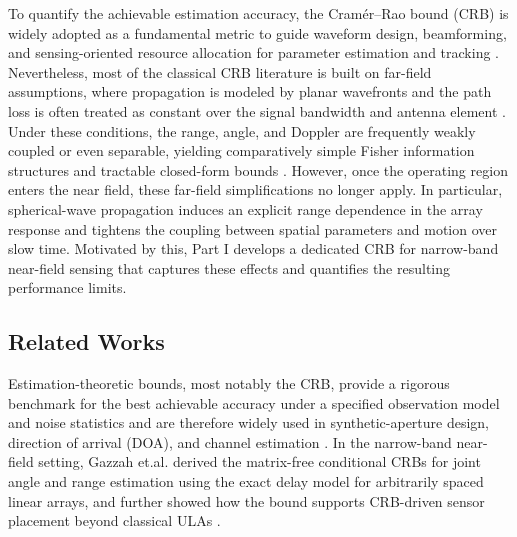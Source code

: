 \documentclass[9pt,final,journal,twocolumn]{IEEEtran}
\begin{document}
To quantify the achievable estimation accuracy, the Cramér–Rao bound (CRB) is widely adopted as a fundamental metric to guide waveform design, beamforming, and sensing-oriented resource allocation for parameter estimation and tracking \cite{esmaeilbeig2022cramer,dokhanchi2019mmWave,lv2022co,wang2024crb2}. Nevertheless, most of the classical CRB literature is built on far-field assumptions, where propagation is modeled by planar wavefronts and the path loss is often treated as constant over the signal bandwidth and antenna element \cite{stoica2005spectral,dogandzic2001crb}. Under these conditions, the range, angle, and Doppler are frequently weakly coupled or even separable, yielding comparatively simple Fisher information structures and tractable closed-form bounds \cite{dogandzic2001crb}. However, once the operating region enters the near field, these far-field simplifications no longer apply. In particular, spherical-wave propagation induces an explicit range dependence in the array response and tightens the coupling between spatial parameters and motion over slow time. Motivated by this, Part I develops a dedicated CRB for narrow-band near-field sensing that captures these effects and quantifies the resulting performance limits.

\vspace{-0.3cm}
\subsection{Related Works}
\vspace{-0.1cm}
Estimation-theoretic bounds, most notably the CRB, provide a rigorous benchmark for the best achievable accuracy under a specified observation model and noise statistics and are therefore widely used in synthetic-aperture design, direction of arrival (DOA), and channel estimation \cite{stoica1990performance,dong2002optimal,wei2025crb}. In the narrow-band near-field setting, Gazzah et.al. derived the matrix-free conditional CRBs for joint angle and range estimation using the exact delay model for arbitrarily spaced linear arrays, and further showed how the bound supports CRB-driven sensor placement beyond classical ULAs \cite{gazzah2014crb}.


\end{document}

